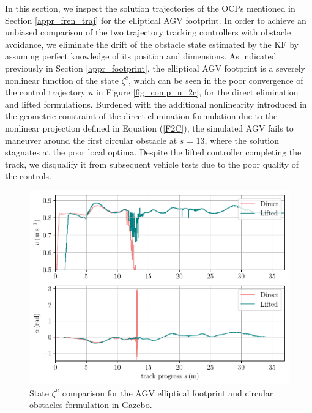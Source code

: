 In this section, we inspect the solution trajectories of the \ac{OCP}s mentioned in Section \ref{appr_fren_traj} for the elliptical \ac{AGV} footprint. 
In order to achieve an unbiased comparison of the two trajectory tracking controllers with obstacle avoidance, we eliminate the drift of the obstacle state estimated by the \ac{KF} by assuming perfect knowledge of its position and dimensions.
As indicated previously in Section \ref{appr_footprint}, the elliptical \ac{AGV} footprint is a severely nonlinear function of the state $\zeta^{c}$, which can be seen in the poor convergence of the control trajectory $u$ in Figure \ref{fig_comp_u_2c}, for the direct elimination and lifted formulations.
Burdened with the additional nonlinearity introduced in the geometric constraint of the direct elimination formulation due to the nonlinear projection defined in Equation (\ref{F2C}), the simulated \ac{AGV} fails to maneuver around the first circular obstacle at $s$ = 13, where the solution stagnates at the poor local optima. Despite the lifted controller completing the track, we disqualify it from subsequent vehicle tests due to the poor quality of the controls. 


\begin{figure}[h!tb]
    \includegraphics[width=1\textwidth]{figures/experiments/zeta_u_2c}
    \caption{State $\zeta^{u}$ comparison for the \ac{AGV} elliptical footprint and circular obstacles formulation in Gazebo.}  \label{fig_comp_zeta_u_2c}
\end{figure}

